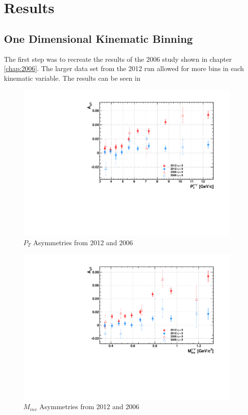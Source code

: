 \documentclass[abstract = on,listof=totoc, bibliography=totoc]{scrreprt}
\begin{document}
 



















\chapter{Results}
\section{One Dimensional Kinematic Binning}


The first step was to recreate the results of the 2006 study shown in chapter \ref{chap:2006}. The larger data set from the 2012 run allowed for more bins in each kinematic variable. The results can be seen in  


\begin{figure}
\begin{center}
\includegraphics[width = .7\textwidth]{Pt_comp_old}
\caption[$P_{T}$ Asymmetries from 2012 and 2006]{$P_{T}$ Asymmetries from 2012 and 2006}
\label{fig:compPt}
\end{center}
\end{figure}

\begin{figure}
\begin{center}
\includegraphics[width = .7\textwidth]{Mass_comp_old}
\caption[$M_{inv}$ Asymmetries from 2012 and 2006]{$M_{inv}$ Asymmetries from 2012 and 2006}
\label{fig:compMass}
\end{center}
\end{figure}
\end{document}

